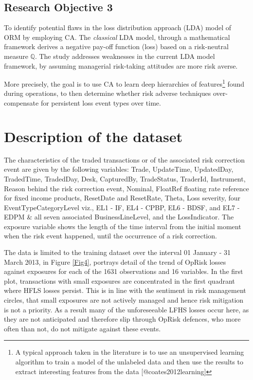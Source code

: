 \documentclass{DissertateUSU}
\begin{document}
\subsection{Research Objective 3}

To identify potential flaws in the loss distribution approach (LDA)
model of ORM by employing CA. The \textit{classical} LDA model, through
a mathematical framework derives a negative pay-off function (loss)
based on a risk-neutral measure \(\mathbb{Q}\). The study addresses
weaknesses in the current LDA model framework, by assuming managerial
risk-taking attitudes are more risk averse.\medskip

More precisely, the goal is to use CA to learn deep hierarchies of
features\footnote{A typical approach taken in the literature is to use an unsupervised learning algorithm to train a model of the unlabeled data and then use the results to extract interesting features from the data [@coates2012learning]}
found during operations, to then determine whether risk adverse
techniques over-compensate for persistent loss event types over time.

\section{Description of the dataset}

The characteristics of the traded transactions or of the associated risk
correction event are given by the following variables: Trade,
UpdateTime, UpdatedDay, TradedTime, TradedDay, Desk, CapturedBy,
TradeStatus, TraderId, Instrument, Reason behind the risk correction
event, Nominal, FloatRef floating rate reference for fixed income
products, ResetDate and ResetRate, Theta, Loss severity, four
EventTypeCategoryLevel viz., EL1 - IF, EL4 - CPBP, EL6 - BDSF, and EL7 -
EDPM \& all seven associated BusinessLineLevel, and the LossIndicator.
The exposure variable shows the length of the time interval from the
initial moment when the risk event happened, until the occurrence of a
risk correction.\medskip

The data is limited to the training dataset over the interval 01 January
- 31 March 2013, in Figure \ref{Fig4}, portrays detail of the trend of
OpRisk losses against exposures for each of the 1631 observations and 16
variables. In the first plot, transactions with small exposures are
concentrated in the first quadrant where HFLS losses persist. This is in
line with the sentiment in risk management circles, that small exposures
are not actively managed and hence risk mitigation is not a priority. As
a result many of the unforeseeable LFHS losses occur here, as they are
not anticipated and therefore slip through OpRisk defences, who more
often than not, do not mitigate against these events.\medskip
\end{document}
